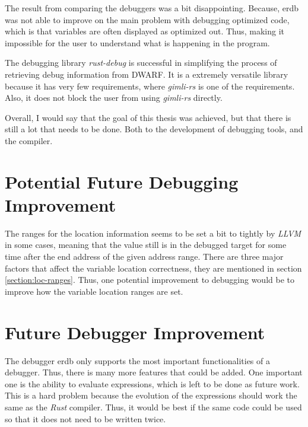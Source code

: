 

The result from comparing the debuggers was a bit disappointing.
Because, \gls{erdb} was not able to improve on the main problem with debugging optimized code, which is that variables are often displayed as optimized out.
Thus, making it impossible for the user to understand what is happening in the program.


The debugging library \emph{rust-debug} is successful in simplifying the process of retrieving debug information from \gls{DWARF}.
It is a extremely versatile library because it has very few requirements, where \emph{gimli-rs} is one of the requirements.
Also, it does not block the user from using \emph{gimli-rs} directly.


Overall, I would say that the goal of this thesis was achieved, but that there is still a lot that needs to be done.
Both to the development of debugging tools, and the compiler.


\section{Potential Future Debugging Improvement}
The ranges for the location information seems to be set a bit to tightly by \emph{LLVM} in some cases, meaning that the value still is in the debugged target for some time after the end address of the given address range.
There are three major factors that affect the variable location correctness, they are mentioned in section \ref{section:loc-ranges}.
Thus, one potential improvement to debugging would be to improve how the variable location ranges are set.


\section{Future Debugger Improvement}
The debugger \gls{erdb} only supports the most important functionalities of a debugger.
Thus, there is many more features that could be added.
One important one is the ability to evaluate expressions, which is left to be done as future work.
This is a hard problem because the evolution of the expressions should work the same as the \emph{Rust} compiler.
Thus, it would be best if the same code could be used so that it does not need to be written twice.


